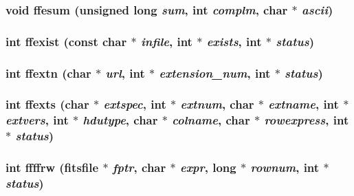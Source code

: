 \subsubsection{\setlength{\rightskip}{0pt plus 5cm}void ffesum (unsigned long {\em sum}, int {\em complm}, char $\ast$ {\em ascii})}\label{test_2roimasker_2fitsio_8h_096fd5df7ef2a55a0e548744a8c93be3}


\subsubsection{\setlength{\rightskip}{0pt plus 5cm}int ffexist (const char $\ast$ {\em infile}, int $\ast$ {\em exists}, int $\ast$ {\em status})}\label{test_2roimasker_2fitsio_8h_a43845de368eac56f4640bb78d54fe12}


\subsubsection{\setlength{\rightskip}{0pt plus 5cm}int ffextn (char $\ast$ {\em url}, int $\ast$ {\em extension\_\-num}, int $\ast$ {\em status})}\label{test_2roimasker_2fitsio_8h_9dcef60f99afddb050fbcd03fa2c97d9}


\subsubsection{\setlength{\rightskip}{0pt plus 5cm}int ffexts (char $\ast$ {\em extspec}, int $\ast$ {\em extnum}, char $\ast$ {\em extname}, int $\ast$ {\em extvers}, int $\ast$ {\em hdutype}, char $\ast$ {\em colname}, char $\ast$ {\em rowexpress}, int $\ast$ {\em status})}\label{test_2roimasker_2fitsio_8h_17f7be49ef6df7e06048b3c9a23d4fd4}


\subsubsection{\setlength{\rightskip}{0pt plus 5cm}int ffffrw (\bf{fitsfile} $\ast$ {\em fptr}, char $\ast$ {\em expr}, long $\ast$ {\em rownum}, int $\ast$ {\em status})}\label{test_2roimasker_2fitsio_8h_7e15c97abea56f20a86aa02d71fe80a2}


